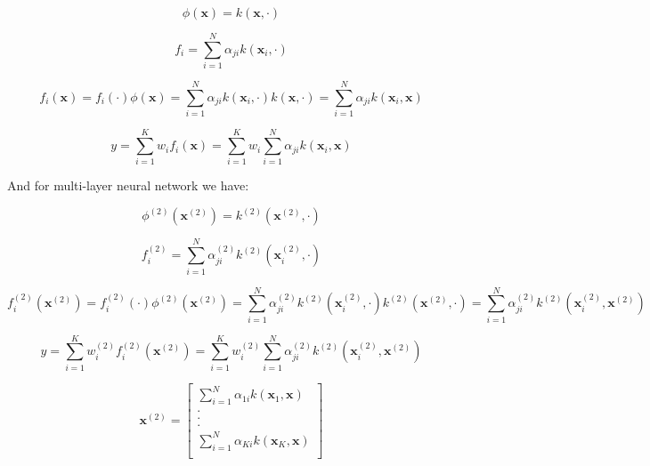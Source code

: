 \documentclass{article}
\begin{document}
\begin{equation}
\phi(\mathbf{x}) = k(\mathbf{x},\cdot)
\end{equation}

\begin{equation}
f_i = \sum\limits_{i=1}^N \alpha_{ji} k(\mathbf{x}_i,\cdot)
\end{equation}

\begin{equation}
f_i(\mathbf{x}) = f_i(\cdot)\phi(\mathbf{x}) = \sum\limits_{i=1}^N \alpha_{ji} k(\mathbf{x}_i,\cdot) k(\mathbf{x}, \cdot) = \sum\limits_{i=1}^N \alpha_{ji} k(\mathbf{x}_i,\mathbf{x})
\end{equation}

\begin{equation}
y = \sum\limits_{i=1}^K w_i f_i(\mathbf{x}) = \sum\limits_{i=1}^K w_i \sum\limits_{i=1}^N \alpha_{ji} k(\mathbf{x}_i,\mathbf{x})
\end{equation}

And for multi-layer neural network we have:

\begin{equation}
\phi^{(2)}(\mathbf{x}^{(2)}) = k^{(2)}(\mathbf{x}^{(2)},\cdot)
\end{equation}

\begin{equation}
f_i^{(2)} = \sum\limits_{i=1}^N \alpha_{ji}^{(2)} k^{(2)}(\mathbf{x}_i^{(2)},\cdot)
\end{equation}

\begin{equation}
f_i^{(2)}(\mathbf{x}^{(2)}) = f_i^{(2)}(\cdot)\phi^{(2)}(\mathbf{x}^{(2)}) = \sum\limits_{i=1}^N \alpha_{ji}^{(2)} k^{(2)}(\mathbf{x}_i^{(2)},\cdot) k^{(2)}(\mathbf{x}^{(2)}, \cdot) = \sum\limits_{i=1}^N \alpha_{ji}^{(2)} k^{(2)}(\mathbf{x}_i^{(2)},\mathbf{x}^{(2)})
\end{equation}

\begin{equation}
y = \sum\limits_{i=1}^K w_i^{(2)} f_i^{(2)}(\mathbf{x}^{(2)}) = \sum\limits_{i=1}^K w_i^{(2)} \sum\limits_{i=1}^N \alpha_{ji}^{(2)} k^{(2)}(\mathbf{x}_i^{(2)},\mathbf{x}^{(2)})
\end{equation}

\begin{equation}
\mathbf{x}^{(2)} = \left[ \begin{array}{c}
  \sum\limits_{i=1}^N \alpha_{1i} k(\mathbf{x}_1,\mathbf{x})\\
  .\\
  .\\
  .\\
  \sum\limits_{i=1}^N \alpha_{Ki} k(\mathbf{x}_K,\mathbf{x})\\
\end{array}
  \right]
\end{equation}
\end{document}
